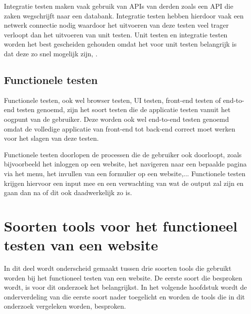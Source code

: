 Integratie testen maken vaak gebruik van \glspl{API} van derden zoals een \gls{API} die zaken wegschrijft naar een databank. Integratie testen hebben hierdoor vaak een netwerk connectie nodig waardoor het uitvoeren van deze testen veel trager verloopt dan het uitvoeren van unit testen. Unit testen en integratie testen worden het best gescheiden gehouden omdat het voor unit testen belangrijk is dat deze zo snel mogelijk zijn, \textcite{Elliott2016}.

\clearpage
\subsection{Functionele testen}

Functionele testen, ook wel browser testen, \gls{UI} testen, front-end testen of end-to-end testen genoemd, zijn het soort testen die de applicatie testen vanuit het oogpunt van de gebruiker. Deze worden ook wel end-to-end testen genoemd omdat de volledige applicatie van front-end tot back-end correct moet werken voor het slagen van deze testen.

Functionele testen doorlopen de processen die de gebruiker ook doorloopt, zoals bijvoorbeeld het inloggen op een website, het navigeren naar een bepaalde pagina via het menu, het invullen van een formulier op een website,... Functionele testen krijgen hiervoor een input mee en een verwachting van wat de output zal zijn en gaan dan na of dit ook daadwerkelijk zo is.

\clearpage
\section{Soorten tools voor het functioneel testen van een website}

In dit deel wordt onderscheid gemaakt tussen drie soorten \glspl{tool} die gebruikt worden bij het functioneel testen van een website. De eerste soort die besproken wordt, is voor dit onderzoek het belangrijkst. In het volgende hoofdstuk wordt de onderverdeling van die eerste soort nader toegelicht en worden de \glspl{tool} die in dit onderzoek vergeleken worden, besproken.


